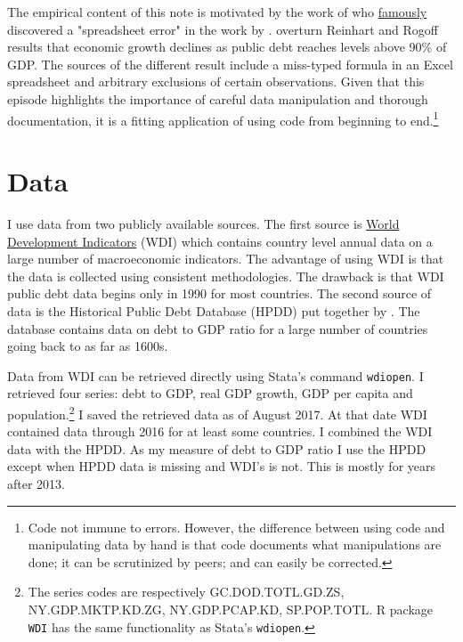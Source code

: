 \documentclass[letterpaper,11pt]{article}
\begin{document}
The empirical content of this note is motivated by the work of \cite{herndon2014does} who \href{http://www.cc.com/video-clips/dcyvro/the-colbert-report-austerity-s-spreadsheet-error}{famously} discovered a "spreadsheet error" in the work by \cite{reinhartrogoffAER2010}. \cite{herndon2014does} overturn Reinhart and Rogoff results that economic growth declines as public debt reaches levels above 90\% of GDP. The sources of the different result include a miss-typed formula in an Excel spreadsheet and arbitrary exclusions of certain observations. Given that this  episode highlights the importance of careful data manipulation and thorough documentation, it is a fitting application of using code from beginning to end.\footnote{Code not immune to errors. However, the difference between using code and manipulating data by hand is that code documents what manipulations are done; it can be scrutinized by peers; and can easily be corrected.} 

\section{Data}

I use data from two publicly available sources. The first source is  \href{http://databank.worldbank.org/data/reports.aspx?source=world-development-indicators&preview=on}{World Development Indicators} (WDI) which contains country level annual data on a large number of macroeconomic indicators. The advantage of using WDI is that the data is collected using consistent methodologies. The drawback is that WDI public debt data begins only in 1990 for most countries. The second source of data is the Historical Public Debt Database (HPDD) put together by \cite{abbas2011historical}. The database contains data on debt to GDP ratio for a large number of countries going back to as far as 1600s. 

Data from WDI can be retrieved directly using Stata's command \texttt{wdiopen}. I retrieved four series: debt to GDP, real GDP growth, GDP per capita and population.\footnote{The series codes are respectively GC.DOD.TOTL.GD.ZS, NY.GDP.MKTP.KD.ZG, NY.GDP.PCAP.KD, SP.POP.TOTL. R package \texttt{WDI} has the same functionality as Stata's \texttt{wdiopen}.} I saved the retrieved data as of August 2017. At that date WDI contained data through 2016 for at least some countries. I combined the WDI data with the HPDD. As my measure of debt to GDP ratio I use the HPDD except when HPDD data is missing and WDI's is not. This is mostly for years after 2013. 
\end{document}
